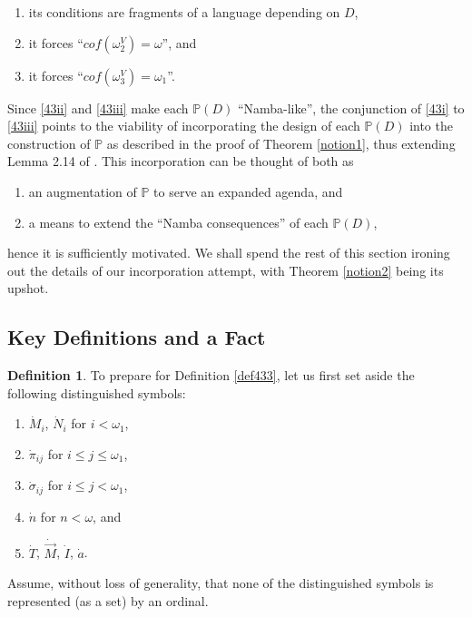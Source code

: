 \documentclass[12pt, twoside]{memoir}
\numberwithin{equation}{section}
\theoremstyle{definition}
\newtheorem{defi}[thm]{Definition}
\theoremstyle{remark}
\theoremstyle{definition}
\theoremstyle{definition}
\theoremstyle{definition}
\theoremstyle{remark}
\begin{document}
\begin{enumerate}[label=(\roman*)]
    \item\label{43i} its conditions are fragments of a language depending on $D$,
    \item\label{43ii} it forces ``$cof(\omega_2^V) = \omega$'', and
    \item\label{43iii} it forces ``$cof(\omega_3^V) = \omega_1$''.
\end{enumerate}
Since \ref{43ii} and \ref{43iii} make each $\mathbb{P}(D)$ ``Namba-like'', the conjunction of \ref{43i} to \ref{43iii} points to the viability of incorporating the design of each $\mathbb{P}(D)$ into the construction of $\mathbb{P}$ as described in the proof of Theorem \ref{notion1}, thus extending Lemma 2.14 of \cite{schindler}. This incorporation can be thought of both as
\begin{enumerate}[label=(\Alph*)]
    \item an augmentation of $\mathbb{P}$ to serve an expanded agenda, and
    \item a means to extend the ``Namba consequences'' of each $\mathbb{P}(D)$,
\end{enumerate}
hence it is sufficiently motivated. We shall spend the rest of this section ironing out the details of our incorporation attempt, with Theorem \ref{notion2} being its upshot.

\subsection{Key Definitions and a Fact}

\begin{defi}\label{defl2}
To prepare for Definition \ref{def433}, let us first set aside the following distinguished symbols:
\begin{enumerate}[label=(\alph*)]
    \item $\dot{M}_i$, $\dot{N}_i$ for $i < \omega_1$,
    \item $\dot{\pi}_{ij}$ for $i \leq j \leq \omega_1$,
    \item $\dot{\sigma}_{ij}$ for $i \leq j < \omega_1$,
    \item $\dot{n}$ for $n < \omega$, and
    \item $\dot{T}$, $\dot{\Vec{M}}$, $\dot{I}$, $\dot{a}$.
\end{enumerate}
Assume, without loss of generality, that none of the distinguished symbols is represented (as a set) by an ordinal.
\end{defi}
\end{document}
